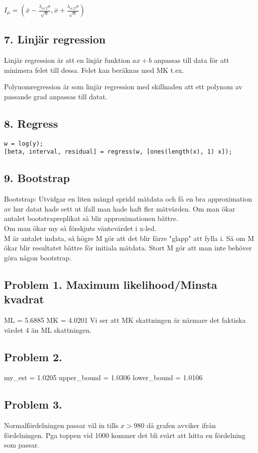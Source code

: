 \documentclass{article}
\begin{document}
$I_{{\mu }}=({\bar  {x}}-{\frac  {\lambda _{{\alpha /2}}\sigma }{{\sqrt
{n}}}},{\bar  {x}}+{\frac  {\lambda _{{\alpha /2}}\sigma }{{\sqrt  {n}}}})$

\subsection*{7. Linjär regression}
Linjär regression är att en linjär funktion $ax+b$ anpassas till data för att
minimera felet till dessa. Felet kan beräknas med MK t.ex.

Polynomregression är som linjär regression med skillnaden att ett polynom av
passande grad anpassas till datat.

\subsection*{8. Regress}

\begin{lstlisting}
w = log(y);
[beta, interval, residual] = regress(w, [ones(length(x), 1) x]);
\end{lstlisting}

\subsection*{9. Bootstrap}
Bootstrap: Utvidgar en liten mängd spridd mätdata och få en bra approximation av
hur datat hade sett ut ifall man hade haft fler mätvärden. Om man ökar antalet
bootstrapreplikat så blir approximationen bättre.
\\Om man ökar my så förskjuts väntevärdet i x-led.
\\M är antalet indata, så högre M gör att det blir färre "glapp" att fylla i. Så
om M ökar blir resultatet bättre för initiala mätdata. Stort M gör att man inte
behöver göra någon bootstrap.

\subsection*{Problem 1. Maximum likelihood/Minsta kvadrat}
ML = 5.6885
MK = 4.0201
Vi ser att MK skattningen är närmare det faktiska värdet 4 än ML skattningen.

\subsection*{Problem 2.}
my\_est = 1.0205
upper\_bound = 1.0306
lower\_bound = 1.0106

\subsection*{Problem 3.}
Normalfördelningen passar väl in tills $x > 980$ då grafen avviker ifrån
fördelningen. Pga toppen vid 1000 kommer det bli svårt att hitta en fördelning
som passar.
\end{document}
